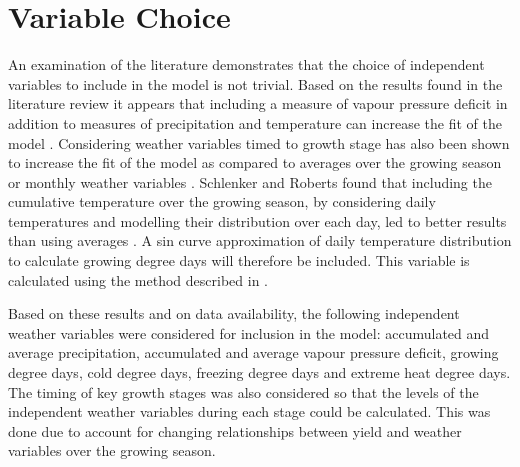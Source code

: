 \section{Variable Choice}

An examination of the literature demonstrates that the choice of independent variables to include in the model is not trivial. Based on the results found in the literature review it appears that including a measure of vapour pressure deficit in addition to measures of precipitation and temperature can increase the fit of the model \citep{roberts2012agronomic}. Considering weather variables timed to growth stage has also been shown to increase the fit of the model as compared to averages over the growing season or monthly weather variables \citep{dixon1994estimating, ozkan2002impacts}. Schlenker and Roberts found that including the cumulative temperature over the growing season, by considering daily temperatures and modelling their distribution over each day, led to better results than using averages \citep{schlenker2009nonlinear}. A sin curve approximation of daily temperature distribution to calculate growing degree days will therefore be included. This variable is calculated using the method described in \cite{snyder1985hand}. 

Based on these results and on data availability, the following independent weather variables were considered for inclusion in the model:  accumulated and average precipitation, accumulated and average vapour pressure deficit, growing degree days, cold degree days, freezing degree days and extreme heat degree days. The timing of key growth stages was also considered so that the levels of the independent weather variables during each stage could be calculated. This was done due to account for changing relationships between yield and weather variables over the growing season. 

